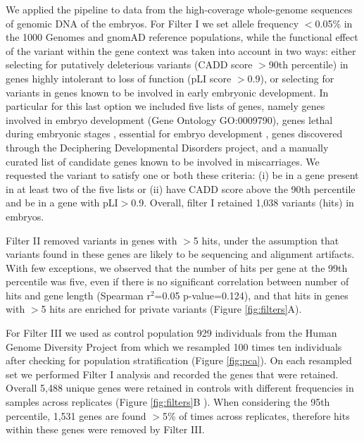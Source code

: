 We applied the \gp pipeline to data from the high-coverage whole-genome sequences of genomic DNA of the embryos. For Filter I we set allele frequency $<$0.05\% in the 1000 Genomes\cite{1000genome2015global} and gnomAD\cite{karczewski2020mutational} reference populations, while the functional effect of the variant within the gene context was taken into account in two ways: either selecting for putatively deleterious variants (CADD score $>$90th percentile) in genes highly intolerant to loss of function (pLI score $>$0.9), or selecting for variants in genes known to be involved in early embryonic development. In particular for this last option we included five lists of genes, namely genes involved in embryo development (Gene Ontology GO:0009790), genes lethal during embryonic stages \cite{dawes2019gene}, essential for embryo development \cite{dawes2019gene}, genes discovered through the Deciphering Developmental Disorders project\cite{study2015large}, and a manually curated list of candidate genes known to be involved in miscarriages. We requested the variant to satisfy one or both these criteria: (i) be in a gene present in at least two of the five lists or (ii) have CADD score above the 90th percentile and be in a gene with pLI$>$0.9. Overall, filter I retained 1,038 variants (hits) in embryos.   

Filter II removed variants in genes with $>$5 hits, under the assumption that variants found in these genes are likely to be sequencing and alignment artifacts. With few exceptions, we observed that the number of hits per gene at the 99th percentile was five, even if there is no significant correlation between number of hits and gene length (Spearman r$^2$=0.05 p-value=0.124), and  that hits in genes with $>$5 hits are enriched for private variants (Figure \ref{fig:filters}A).  

For Filter III we used as control population 929 individuals from the Human Genome Diversity Project\cite{bergstrom2020insights} from which we resampled 100 times ten individuals after checking for population stratification (Figure \ref{fig:pca}). On each resampled set we performed Filter I analysis and recorded the genes that were retained. Overall 5,488 unique genes were retained in controls with different frequencies in samples across replicates (Figure \ref{fig:filters}B ). When considering the 95th percentile, 1,531 genes are found $>$5\% of times across replicates, therefore hits within these genes were removed by Filter III. %

